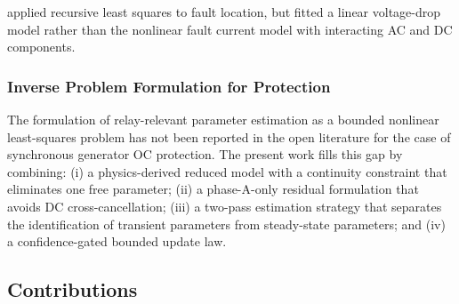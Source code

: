 \documentclass[12pt, a4paper]{article}
\theoremstyle{definition}
\theoremstyle{plain}
\begin{document}
\citet{Girgis1992} applied recursive least squares to fault location, but
fitted a linear voltage-drop model rather than the nonlinear fault current
model with interacting AC and DC components.

\subsubsection{Inverse Problem Formulation for Protection}

The formulation of relay-relevant parameter estimation as a bounded nonlinear
least-squares problem has not been reported in the open literature for the
case of synchronous generator OC protection.  The present work fills this gap
by combining: (i) a physics-derived reduced model with a continuity constraint
that eliminates one free parameter; (ii) a phase-A-only residual formulation
that avoids DC cross-cancellation; (iii) a two-pass estimation strategy that
separates the identification of transient parameters from steady-state
parameters; and (iv) a confidence-gated bounded update law.

\subsection{Contributions}
\label{sec:intro:contributions}
\end{document}
